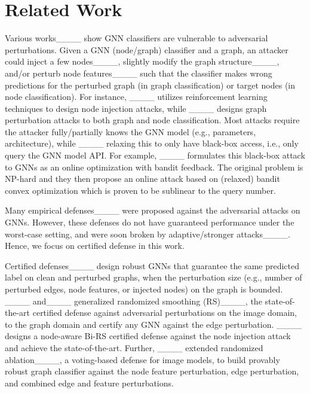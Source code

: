 \section{Related Work}
\label{sec:related}

 Various  works____ show GNN classifiers are vulnerable to adversarial perturbations. Given a GNN (node/graph) classifier and a graph, an attacker could inject a few nodes____, slightly modify the graph structure____, and/or perturb node features____ such that the classifier makes wrong predictions for the perturbed graph (in graph classification) or target nodes (in node classification).    
For instance, ____ utilizes reinforcement learning techniques to design node injection attacks, while ____ designs graph perturbation attacks to both graph and node classification.  
Most attacks require the attacker fully/partially knows the GNN model (e.g., parameters, architecture), while ____ relaxing this to  only have black-box access, i.e., only query the GNN model API. For example,  ____ formulates this black-box attack to GNNs as an online optimization with bandit feedback. The original problem is NP-hard and they then propose an online attack based on (relaxed) bandit convex optimization which is proven to be {sublinear} to the query number. 

\vspace{+0.05in}
Many empirical defenses____ were proposed against the adversarial attacks on GNNs. However, these defenses do not have guaranteed performance under the worst-case setting, and were soon broken by adaptive/stronger  attacks____. Hence, we focus on certified defense in this work. 

Certified defenses____ design robust GNNs that guarantee the same predicted label on clean and perturbed graphs, when the perturbation size (e.g., number of perturbed edges, node features, or injected nodes) on the graph is bounded. 
____ and____ generalized randomized smoothing (RS)____, the state-of-the-art certified defense against adversarial perturbations on the image domain, to the graph domain and certify any GNN against the edge perturbation. ____ designs a node-aware Bi-RS certified defense against the node injection attack and achieve the state-of-the-art. 
Further, ____ extended randomized ablation____, a voting-based defense for image models, to build provably robust graph classifier against the node feature perturbation, edge perturbation, and combined edge and feature perturbations.   

